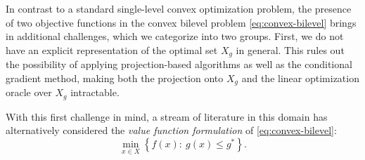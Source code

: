 \documentclass[11pt,oneside]{article}
\theoremstyle{plain}
\theoremstyle{plain}
\theoremstyle{plain}%
\newcommand{\set}[1]{\left\{#1\right\}}
\begin{document}
In contrast to a standard single-level convex optimization problem, the presence of two objective functions in the convex bilevel problem \eqref{eq:convex-bilevel} brings in additional challenges, which we categorize into two groups.
First, we do not have an explicit representation of the optimal set $X_g$ in general. This rules out the possibility of applying projection-based algorithms as well as the conditional gradient method, making both the projection onto $X_g$ and the linear optimization oracle over $X_g$ intractable.

With this first challenge in mind, a stream of literature in this domain has alternatively considered the \emph{value function formulation} of \eqref{eq:convex-bilevel}:
\begin{equation} \label{eq:convex-bilevel-value}
    \min_{x\in X} \set{ f(x) :\ g(x) \leq g^* }.
\end{equation}
\end{document}
